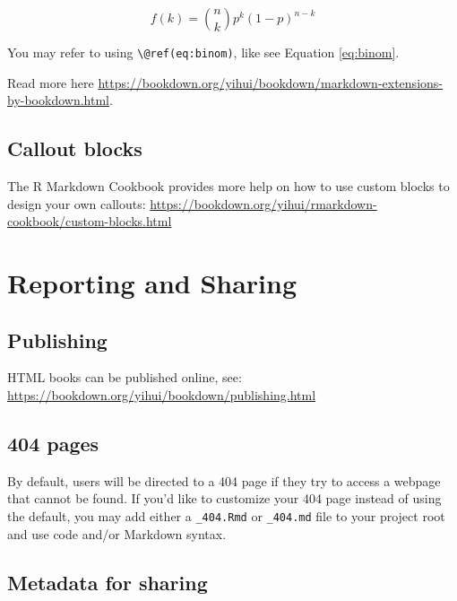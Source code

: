 \documentclass[
]{book}
\begin{document}
\begin{equation} 
  f\left(k\right) = \binom{n}{k} p^k\left(1-p\right)^{n-k}
  \label{eq:binom}
\end{equation}

You may refer to using \texttt{\textbackslash{}@ref(eq:binom)}, like see Equation \eqref{eq:binom}.

Read more here \url{https://bookdown.org/yihui/bookdown/markdown-extensions-by-bookdown.html}.

\hypertarget{callout-blocks}{%
\section{Callout blocks}\label{callout-blocks}}

The R Markdown Cookbook provides more help on how to use custom blocks to design your own callouts: \url{https://bookdown.org/yihui/rmarkdown-cookbook/custom-blocks.html}

\hypertarget{reporting-and-sharing}{%
\chapter{Reporting and Sharing}\label{reporting-and-sharing}}

\hypertarget{publishing}{%
\section{Publishing}\label{publishing}}

HTML books can be published online, see: \url{https://bookdown.org/yihui/bookdown/publishing.html}

\hypertarget{pages}{%
\section{404 pages}\label{pages}}

By default, users will be directed to a 404 page if they try to access a webpage that cannot be found. If you'd like to customize your 404 page instead of using the default, you may add either a \texttt{\_404.Rmd} or \texttt{\_404.md} file to your project root and use code and/or Markdown syntax.

\hypertarget{metadata-for-sharing}{%
\section{Metadata for sharing}\label{metadata-for-sharing}}
\end{document}
